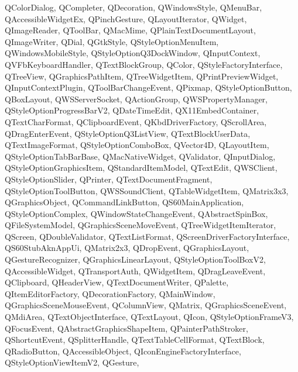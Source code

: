 {{    QColorDialog,%
    QCompleter,%
    QDecoration,%
    QWindowsStyle,%
    QMenuBar,%
    QAccessibleWidgetEx,%
    QPinchGesture,%
    QLayoutIterator,%
    QWidget,%
    QImageReader,%
    QToolBar,%
    QMacMime,%
    QPlainTextDocumentLayout,%
    QImageWriter,%
    QDial,%
    QGtkStyle,%
    QStyleOptionMenuItem,%
    QWindowsMobileStyle,%
    QStyleOptionQ3DockWindow,%
    QInputContext,%
    QVFbKeyboardHandler,%
    QTextBlockGroup,%
    QColor,%
    QStyleFactoryInterface,%
    QTreeView,%
    QGraphicsPathItem,%
    QTreeWidgetItem,%
    QPrintPreviewWidget,%
    QInputContextPlugin,%
    QToolBarChangeEvent,%
    QPixmap,%
    QStyleOptionButton,%
    QBoxLayout,%
    QWSServerSocket,%
    QActionGroup,%
    QWSPropertyManager,%
    QStyleOptionProgressBarV2,%
    QDateTimeEdit,%
    QX11EmbedContainer,%
    QTextCharFormat,%
    QClipboardEvent,%
    QKbdDriverFactory,%
    QScrollArea,%
    QDragEnterEvent,%
    QStyleOptionQ3ListView,%
    QTextBlockUserData,%
    QTextImageFormat,%
    QStyleOptionComboBox,%
    QVector4D,%
    QLayoutItem,%
    QStyleOptionTabBarBase,%
    QMacNativeWidget,%
    QValidator,%
    QInputDialog,%
    QStyleOptionGraphicsItem,%
    QStandardItemModel,%
    QTextEdit,%
    QWSClient,%
    QStyleOptionSlider,%
    QPrinter,%
    QTextDocumentFragment,%
    QStyleOptionToolButton,%
    QWSSoundClient,%
    QTableWidgetItem,%
    QMatrix3x3,%
    QGraphicsObject,%
    QCommandLinkButton,%
    QS60MainApplication,%
    QStyleOptionComplex,%
    QWindowStateChangeEvent,%
    QAbstractSpinBox,%
    QFileSystemModel,%
    QGraphicsSceneMoveEvent,%
    QTreeWidgetItemIterator,%
    QScreen,%
    QDoubleValidator,%
    QTextListFormat,%
    QScreenDriverFactoryInterface,%
    QS60StubAknAppUi,%
    QMatrix2x3,%
    QDropEvent,%
    QGraphicsLayout,%
    QGestureRecognizer,%
    QGraphicsLinearLayout,%
    QStyleOptionToolBoxV2,%
    QAccessibleWidget,%
    QTransportAuth,%
    QWidgetItem,%
    QDragLeaveEvent,%
    QClipboard,%
    QHeaderView,%
    QTextDocumentWriter,%
    QPalette,%
    QItemEditorFactory,%
    QDecorationFactory,%
    QMainWindow,%
    QGraphicsSceneMouseEvent,%
    QColumnView,%
    QMatrix,%
    QGraphicsSceneEvent,%
    QMdiArea,%
    QTextObjectInterface,%
    QTextLayout,%
    QIcon,%
    QStyleOptionFrameV3,%
    QFocusEvent,%
    QAbstractGraphicsShapeItem,%
    QPainterPathStroker,%
    QShortcutEvent,%
    QSplitterHandle,%
    QTextTableCellFormat,%
    QTextBlock,%
    QRadioButton,%
    QAccessibleObject,%
    QIconEngineFactoryInterface,%
    QStyleOptionViewItemV2,%
    QGesture,%
}}
